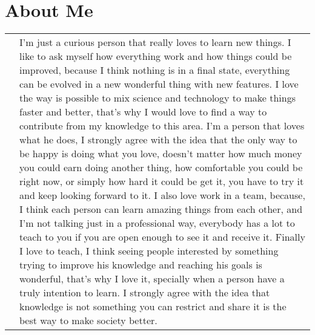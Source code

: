 \documentclass[a4paper,10pt]{article} %
\begin{document}
\section{About Me}
\begin{tabular}{r|p{11cm}}
& \footnotesize{I'm just a curious person that really loves to learn new things. I like to ask myself how everything work and how things could be improved, because I think nothing is in a final state, everything can be evolved in a new wonderful thing with new features.
\newline
\newline
I love the way is possible to mix science and technology to make things faster and better, that's why I would love to find a way to contribute from my knowledge to this area.
\newline
\newline
I'm a person that loves what he does, I strongly agree with the idea that the only way to be happy is doing what you love, doesn't matter how much money you could earn doing another thing, how comfortable you could be right now, or simply how hard it could be get it, you have to try it and keep looking forward to it.
\newline
\newline
I also love work in a team, because, I think each person can learn amazing things from each other, and I'm not talking just in a professional way, everybody has a lot to teach to you if you are open enough to see it and receive it.
\newline
\newline
Finally I love to teach, I think seeing people interested by something trying to improve his knowledge and reaching his goals is wonderful, that's why I love it, specially when a person have a truly intention to learn. I strongly agree with the idea that knowledge is not something you can restrict and share it is the best way to make society better.}
\end{tabular}
\fi


\end{document}
